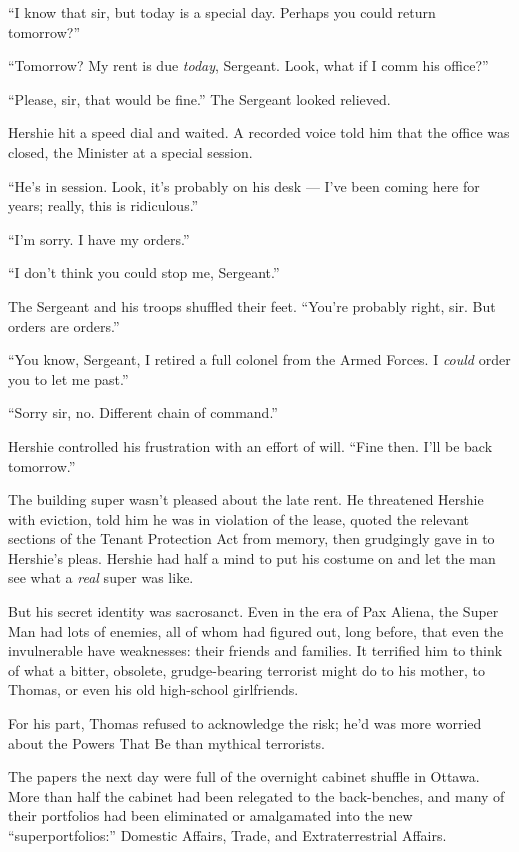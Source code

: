 ``I know that sir, but today is a special day. Perhaps you could return 
tomorrow?''

``Tomorrow? My rent is due \emph{today}, Sergeant. Look, what if I comm his 
office?''

``Please, sir, that would be fine.'' The Sergeant looked relieved.

Hershie hit a speed dial and waited. A recorded voice told him that
the office was closed, the Minister at a special session.

``He's in session. Look, it's probably on his desk --- I've been coming here 
for years; really, this is ridiculous.''

``I'm sorry. I have my orders.''

``I don't think you could stop me, Sergeant.''

The Sergeant and his troops shuffled their feet.
``You're probably right, sir. But orders are orders.''

``You know, Sergeant, I retired a full colonel from the Armed Forces. I 
\emph{could} order you to let me past.''

``Sorry sir, no. Different chain of command.''

Hershie controlled his frustration with an effort of will.
``Fine then. I'll be back tomorrow.''

\tb

The building super wasn't pleased about the late rent. He
threatened Hershie with eviction, told him he was in violation of
the lease, quoted the relevant sections of the Tenant Protection
Act from memory, then grudgingly gave in to Hershie's pleas.
Hershie had half a mind to put his costume on and let the man see
what a \emph{real} super was like.

But his secret identity was sacrosanct. Even in the era of Pax
Aliena, the Super Man had lots of enemies, all of whom had figured
out, long before, that even the invulnerable have weaknesses: their
friends and families. It terrified him to think of what a bitter,
obsolete, grudge-bearing terrorist might do to his mother, to
Thomas, or even his old high-school girlfriends.

For his part, Thomas refused to acknowledge the risk; he'd was more
worried about the Powers That Be than mythical terrorists.

The papers the next day were full of the overnight cabinet shuffle
in Ottawa. More than half the cabinet had been relegated to the
back-benches, and many of their portfolios had been eliminated or
amalgamated into the new ``superportfolios:'' Domestic Affairs,
Trade, and Extraterrestrial Affairs.

